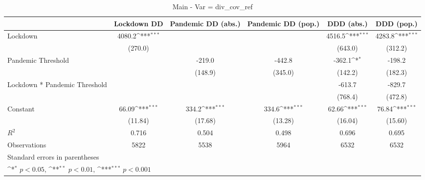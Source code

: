 \documentclass{article}
\begin{document}
{
\def\sym#1{\ifmmode^{#1}\else\(^{#1}\)\fi}
\begin{longtable}{l*{5}{c}}
\caption{Main - Var = div\_cov\_ref}\\
\hline\hline\endfirsthead\hline\endhead\hline\endfoot\endlastfoot
                &\multicolumn{1}{c}{Lockdown DD}&\multicolumn{1}{c}{Pandemic DD (abs.)}&\multicolumn{1}{c}{Pandemic DD (pop.)}&\multicolumn{1}{c}{DDD (abs.)}&\multicolumn{1}{c}{DDD (pop.)}\\
\hline
Lockdown        &   4080.2\sym{***}&                  &                  &   4516.5\sym{***}&   4283.8\sym{***}\\
                &  (270.0)         &                  &                  &  (643.0)         &  (312.2)         \\
Pandemic Threshold&                  &   -219.0         &   -442.8         &   -362.1\sym{*}  &   -198.2         \\
                &                  &  (148.9)         &  (345.0)         &  (142.2)         &  (182.3)         \\
Lockdown * Pandemic Threshold&                  &                  &                  &   -613.7         &   -829.7         \\
                &                  &                  &                  &  (768.4)         &  (472.8)         \\
Constant        &    66.09\sym{***}&    334.2\sym{***}&    334.6\sym{***}&    62.66\sym{***}&    76.84\sym{***}\\
                &  (11.84)         &  (17.68)         &  (13.28)         &  (16.04)         &  (15.60)         \\
\hline
\(R^{2}\)       &    0.716         &    0.504         &    0.498         &    0.696         &    0.695         \\
Observations    &     5822         &     5538         &     5964         &     6532         &     6532         \\
\hline\hline
\multicolumn{6}{l}{\footnotesize Standard errors in parentheses}\\
\multicolumn{6}{l}{\footnotesize \sym{*} \(p<0.05\), \sym{**} \(p<0.01\), \sym{***} \(p<0.001\)}\\
\end{longtable}
}
\end{document}
